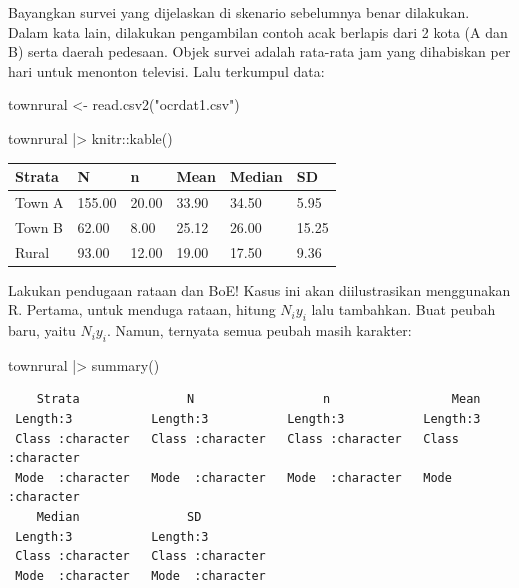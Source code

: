 \documentclass[
  letterpaper,
  DIV=11,
  numbers=noendperiod]{scrreprt}
\newenvironment{Shaded}{\begin{snugshade}}{\end{snugshade}}
\newcommand{\FunctionTok}[1]{\textcolor[rgb]{0.28,0.35,0.67}{#1}}
\newcommand{\NormalTok}[1]{\textcolor[rgb]{0.00,0.23,0.31}{#1}}
\newcommand{\OtherTok}[1]{\textcolor[rgb]{0.00,0.23,0.31}{#1}}
\newcommand{\SpecialCharTok}[1]{\textcolor[rgb]{0.37,0.37,0.37}{#1}}
\newcommand{\StringTok}[1]{\textcolor[rgb]{0.13,0.47,0.30}{#1}}
\begin{document}
Bayangkan survei yang dijelaskan di skenario sebelumnya benar dilakukan.
Dalam kata lain, dilakukan pengambilan contoh acak berlapis dari 2 kota
(A dan B) serta daerah pedesaan. Objek survei adalah rata-rata jam yang
dihabiskan per hari untuk menonton televisi. Lalu terkumpul data:

\begin{Shaded}
\begin{Highlighting}[]
\NormalTok{townrural }\OtherTok{\textless{}{-}} \FunctionTok{read.csv2}\NormalTok{(}\StringTok{"ocrdat1.csv"}\NormalTok{) }

\NormalTok{townrural }\SpecialCharTok{|\textgreater{}}\NormalTok{ knitr}\SpecialCharTok{::}\FunctionTok{kable}\NormalTok{()}
\end{Highlighting}
\end{Shaded}

\begin{longtable}[]{@{}llllll@{}}
\toprule()
Strata & N & n & Mean & Median & SD \\
\midrule()
\endhead
Town A & 155.00 & 20.00 & 33.90 & 34.50 & 5.95 \\
Town B & 62.00 & 8.00 & 25.12 & 26.00 & 15.25 \\
Rural & 93.00 & 12.00 & 19.00 & 17.50 & 9.36 \\
\bottomrule()
\end{longtable}

Lakukan pendugaan rataan dan BoE! Kasus ini akan diilustrasikan
menggunakan R. Pertama, untuk menduga rataan, hitung \(N_iy_i\) lalu
tambahkan. Buat peubah baru, yaitu \(N_iy_i\). Namun, ternyata semua
peubah masih karakter:

\begin{Shaded}
\begin{Highlighting}[]
\NormalTok{townrural }\SpecialCharTok{|\textgreater{}} \FunctionTok{summary}\NormalTok{()}
\end{Highlighting}
\end{Shaded}

\begin{verbatim}
    Strata               N                  n                 Mean          
 Length:3           Length:3           Length:3           Length:3          
 Class :character   Class :character   Class :character   Class :character  
 Mode  :character   Mode  :character   Mode  :character   Mode  :character  
    Median               SD           
 Length:3           Length:3          
 Class :character   Class :character  
 Mode  :character   Mode  :character  
\end{verbatim}
\end{document}
